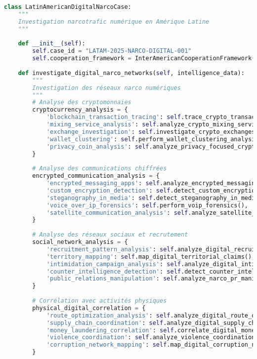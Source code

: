 \begin{lstlisting}[language=Python, caption=Investigation narcotrafic numérique transfrontalier]
class LatinAmericanDigitalNarcoCase:
    """
    Investigation narcotrafic numérique en Amérique Latine
    """
    
    def __init__(self):
        self.case_id = "LATAM-2025-NARCO-DIGITAL-001"
        self.cooperation_framework = InterAmericanCooperationFramework()
        
    def investigate_digital_narco_networks(self, intelligence_data):
        """
        Investigation des réseaux narco numériques
        """
        # Analyse des cryptomonnaies
        cryptocurrency_analysis = {
            'blockchain_transaction_tracing': self.trace_crypto_transactions(),
            'mixing_service_analysis': self.analyze_crypto_mixing_services(),
            'exchange_investigation': self.investigate_crypto_exchanges(),
            'wallet_clustering': self.perform_wallet_clustering_analysis(),
            'privacy_coin_analysis': self.analyze_privacy_focused_cryptocurrencies()
        }
        
        # Analyse des communications chiffrées
        encrypted_communication_analysis = {
            'encrypted_messaging_apps': self.analyze_encrypted_messaging_usage(),
            'custom_encryption_detection': self.detect_custom_encryption_schemes(),
            'steganography_in_media': self.detect_steganography_in_media_sharing(),
            'voice_over_ip_forensics': self.perform_voip_forensics(),
            'satellite_communication_analysis': self.analyze_satellite_communications()
        }
        
        # Analyse des réseaux sociaux et recrutement
        social_network_analysis = {
            'recruitment_pattern_analysis': self.analyze_digital_recruitment_patterns(),
            'territory_mapping': self.map_digital_territorial_claims(),
            'intimidation_campaign_analysis': self.analyze_digital_intimidation_campaigns(),
            'counter_intelligence_detection': self.detect_counter_intelligence_activities(),
            'public_relations_manipulation': self.analyze_narco_pr_manipulation()
        }
        
        # Corrélation avec activités physiques
        physical_digital_correlation = {
            'route_optimization_analysis': self.analyze_digital_route_optimization(),
            'supply_chain_coordination': self.analyze_digital_supply_chain_coordination(),
            'money_laundering_correlation': self.correlate_digital_money_laundering(),
            'violence_coordination': self.analyze_violence_coordination_digital_tools(),
            'corruption_network_mapping': self.map_digital_corruption_networks()
        }
        

\end{lstlisting}
